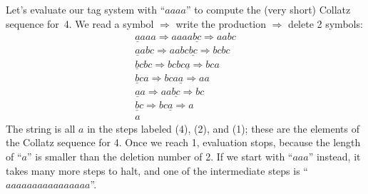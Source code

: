 \documentclass[../generics]{subfiles}
\begin{document}
\begin{example}
Let's evaluate our tag system with ``$aaaa$'' to compute the (very short) Collatz sequence for~4. We read a symbol $\Rightarrow$ write the production $\Rightarrow$ delete 2 symbols:
\begin{gather*}
\underline{a}aaa \Rightarrow aaaa\underline{bc} \Rightarrow aabc \tag{4}\\
\underline{a}abc \Rightarrow aabc\underline{bc} \Rightarrow bcbc\\
\underline{b}cbc \Rightarrow bcbc\underline{a} \Rightarrow bca\\
\underline{b}ca \Rightarrow bca\underline{a} \Rightarrow aa\\
\underline{a}a \Rightarrow aa\underline{bc} \Rightarrow bc\tag{2}\\
\underline{b}c \Rightarrow bc\underline{a} \Rightarrow a\\
a\tag{1}
\end{gather*}
The string is all $a$ in the steps labeled (4), (2), and (1); these are the elements of the Collatz sequence for 4. Once we reach 1, evaluation stops, because the length of ``$a$'' is smaller than the deletion number of 2. If we start with ``$aaa$'' instead, it takes many more steps to halt, and one of the intermediate steps is ``$aaaaaaaaaaaaaaaa$''.
\end{example}

\newcommand{\Tag}{\texttt{Tag}}

\newcommand{\Halt}{\texttt{Halt}}

\newcommand{\SigmaA}{\Sigma_{\nA}}
\newcommand{\SigmaB}{\Sigma_{\nB}}
\newcommand{\SigmaC}{\Sigma_{\nC}}
\newcommand{\SigmaAA}{\Sigma_{\texttt{AA}}}
\newcommand{\SigmaBB}{\Sigma_{\texttt{BB}}}
\newcommand{\SigmaCC}{\Sigma_{\texttt{CC}}}
\newcommand{\SigmaEnd}{\Sigma_{\texttt{End}}}
\newcommand{\SigmaHalt}{\Sigma_{\Halt}}
\newcommand{\SigmaDel}{\Sigma_{\texttt{Del}}}
\newcommand{\TNext}{\texttt{$\uptau$.Next}}

\newcommand{\ConfAATag}{\ConfReq{AA<$\uptau$>}{Tag}}
\newcommand{\ConfBBTag}{\ConfReq{BB<$\uptau$>}{Tag}}
\newcommand{\ConfCCTag}{\ConfReq{CC<$\uptau$>}{Tag}}
\newcommand{\ConfEndTag}{\ConfReq{End}{Tag}}
\newcommand{\ConfHaltTag}{\ConfReq{Halt}{Tag}}

\newcommand{\GTag}{G_\texttt{Tag}}

\newcommand{\ConfTTag}{\ConfReq{$\uptau$}{Tag}}

\newcommand{\AssocConfATag}{\AssocConf{Self.A}{Tag}}
\newcommand{\AssocConfBTag}{\AssocConf{Self.B}{Tag}}
\newcommand{\AssocConfCTag}{\AssocConf{Self.C}{Tag}}
\newcommand{\AssocConfDelTag}{\AssocConf{Self.Del}{Tag}}
\end{document}
